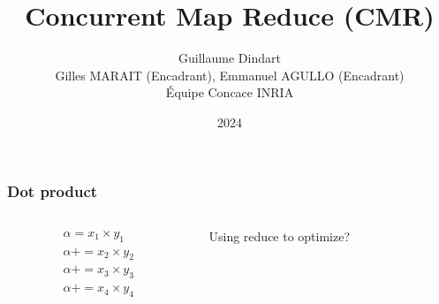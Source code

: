 \documentclass{beamer}
\title{Concurrent Map Reduce (CMR)}
\author{Guillaume Dindart \\[1ex] \small Gilles MARAIT (Encadrant), Emmanuel AGULLO (Encadrant) \\ Équipe Concace INRIA}
\date{2024}
\begin{document}
\frame{\titlepage}


\begin{frame}
    \frametitle{Dot product}
    \begin{columns}[T]
        \begin{column}{0.5\textwidth}  %
            \begin{minipage}[t][.5\textheight]{\textwidth}
                \begin{center}
                    
                \end{center}
            \end{minipage}\par
            \begin{minipage}[t][.5\textheight]{\textwidth}
                \begin{equation*}
                    \begin{split}
                        \alpha = x_1 \times y_1  \\
                        \alpha += x_2 \times y_2 \\
                        \alpha += x_3 \times y_3 \\
                        \alpha += x_4 \times y_4
                    \end{split}
                \end{equation*}
            \end{minipage}
        \end{column}

        \begin{column}{0.5\textwidth}
            \begin{minipage}[t][.5\textheight]{\textwidth}
                \begin{center}
                    
                \end{center}
            \end{minipage}\par
            \begin{minipage}[t][.5\textheight]{\textwidth}
                Using reduce to optimize?
            \end{minipage}


        \end{column}
    \end{columns}
\end{frame}
\end{document}
